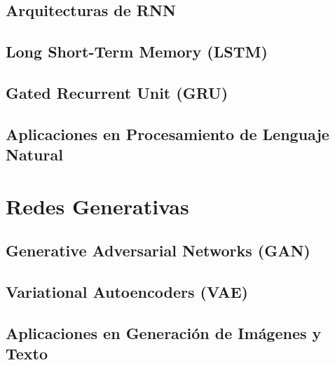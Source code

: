 \documentclass{book}
\begin{document}
\subsection{Arquitecturas de RNN}
\newpage
\subsection{Long Short-Term Memory (LSTM)}
\newpage
\subsection{Gated Recurrent Unit (GRU)}
\newpage
\subsection{Aplicaciones en Procesamiento de Lenguaje Natural}
\newpage
\section{Redes Generativas}

\subsection{Generative Adversarial Networks (GAN)}
\newpage
\subsection{Variational Autoencoders (VAE)}
\newpage
\subsection{Aplicaciones en Generación de Imágenes y Texto}
\newpage
\end{document}

